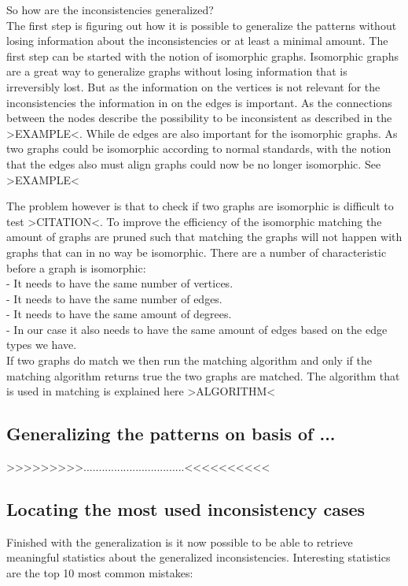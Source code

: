 \documentclass{article}
\begin{document}
So how are the inconsistencies generalized?\\
The first step is figuring out how it is possible to generalize the patterns without losing information about the inconsistencies or at least a minimal amount. The first step can be started with the notion of isomorphic graphs. Isomorphic graphs are a great way to generalize graphs without losing information that is irreversibly lost. But as the information on the vertices is not relevant for the inconsistencies the information in on the edges is important. As the connections between the nodes describe the possibility to be inconsistent as described in the >EXAMPLE<. While de edges are also important for the isomorphic graphs. As two graphs could be isomorphic according to normal standards, with the notion that the edges also must align graphs could now be no longer isomorphic. See >EXAMPLE<

The problem however is that to check if two graphs are isomorphic is difficult to test >CITATION<. 
To improve the efficiency of the isomorphic matching the amount of graphs are pruned such that matching the graphs will not happen with graphs that can in no way be isomorphic. There are a number of characteristic before a graph is isomorphic:\\
 - It needs to have the same number of vertices.\\
 - It needs to have the same number of edges.\\
 - It needs to have the same amount of degrees.\\
 - In our case it also needs to have the same amount of edges based on the edge types we have.\\
 
If two graphs do match we then run the matching algorithm and only if the matching algorithm returns true the two graphs are matched.
The algorithm that is used in matching is explained here >ALGORITHM<


\subsection{Generalizing the patterns on basis of ...}
>>>>>>>>>.................................<<<<<<<<<<


\subsection{Locating the most used inconsistency cases}
Finished with the generalization is it now possible to be able to retrieve meaningful statistics about the generalized inconsistencies. Interesting statistics are the top 10 most common mistakes:
\end{document}
